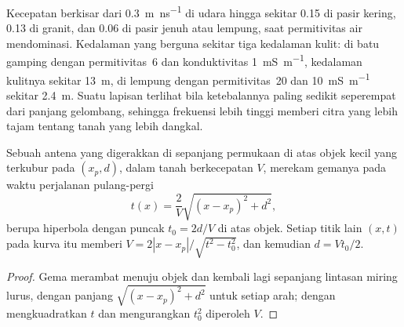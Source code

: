 Kecepatan berkisar dari \qty{0.3}{m.ns^{-1}} di udara hingga sekitar \num{0.15} di
pasir kering, \num{0.13} di granit, dan \num{0.06} di pasir jenuh atau
lempung, saat permitivitas air mendominasi. Kedalaman yang berguna
sekitar tiga kedalaman kulit: di batu gamping dengan permitivitas~6 dan
konduktivitas \qty{1}{mS.m^{-1}}, kedalaman kulitnya sekitar \qty{13}{m},
di lempung dengan permitivitas~20 dan \qty{10}{mS.m^{-1}} sekitar
\qty{2.4}{m}. Suatu lapisan terlihat bila ketebalannya paling sedikit seperempat dari
panjang gelombang, sehingga frekuensi lebih tinggi memberi citra yang lebih tajam
tentang tanah yang lebih dangkal.

\begin{proposition}\label{prop:b3:field-lab-methods-3:hyperbola}
Sebuah antena yang digerakkan di sepanjang permukaan di atas objek kecil yang terkubur pada
$(x_p, d)$, dalam tanah berkecepatan $V$, merekam gemanya pada waktu
perjalanan pulang-pergi
\[
t(x) = \frac{2}{V}\sqrt{(x - x_p)^2 + d^2} ,
\]
berupa hiperbola dengan puncak $t_0 = 2d/V$ di atas objek. Setiap titik lain
$(x, t)$ pada kurva itu memberi $V = 2|x - x_p|/\sqrt{t^2 - t_0^2}$, dan kemudian $d =
Vt_0/2$.
\end{proposition}

\begin{proof}
Gema merambat menuju objek dan kembali lagi sepanjang lintasan miring lurus,
dengan panjang $\sqrt{(x - x_p)^2 + d^2}$ untuk setiap arah; dengan mengkuadratkan $t$ dan
mengurangkan $t_0^2$ diperoleh $V$.
\end{proof}

